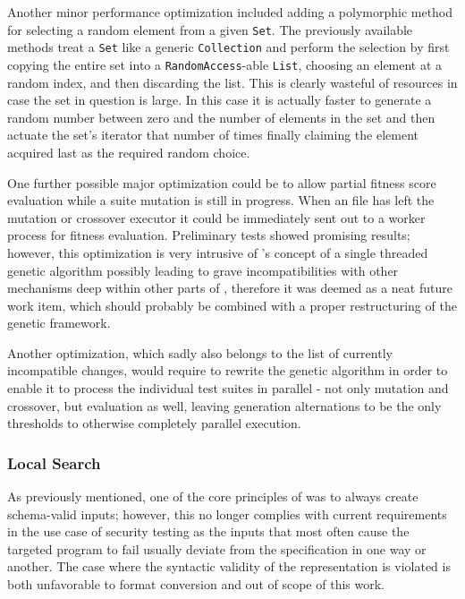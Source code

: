 Another minor performance optimization included adding a polymorphic method for selecting a random 
element from a given \texttt{Set}. The previously available methods treat a \texttt{Set} like a 
generic \texttt{Collection} and perform the selection by first copying the entire set into a 
\texttt{RandomAccess}-able \texttt{List}, choosing an element at a random index, and then discarding the list.
This is clearly wasteful of resources in case the set in question is large. In this case it is actually faster
to generate a random number between zero and the number of elements in the set and then actuate the set's
iterator that number of times finally claiming the element acquired last as the required random choice.

One further possible major optimization could be to allow partial fitness score evaluation while a suite 
mutation is still in progress. When an \xml file has left the mutation or crossover executor it could be 
immediately sent out to a worker process for fitness evaluation. Preliminary tests showed promising 
results; however, this optimization is very intrusive of \evosuite's concept of a single threaded 
genetic algorithm possibly leading to grave incompatibilities with other mechanisms deep within other parts 
of \evosuite, therefore it was deemed as a neat future work item, which should probably be combined with a 
proper restructuring of the genetic framework.

Another optimization, which sadly also belongs to the list of currently incompatible changes, would require to
rewrite the genetic algorithm in order to enable it to process the individual test suites in parallel -
not only mutation and crossover, but evaluation as well, leaving generation alternations to be the only
thresholds to otherwise completely parallel execution.
\subsubsection{Local Search}
As previously mentioned, one of the core principles of \xmlmate was to always create schema-valid inputs; 
however, this no longer complies with current requirements in the use case of security testing as the 
inputs that most often cause the targeted program to fail usually deviate from the specification in 
one way or another. The case where the syntactic validity of the \xml representation is violated is 
both unfavorable to format conversion and out of scope of this work.

